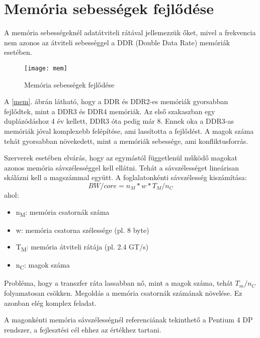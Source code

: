 \section{Memória sebességek fejlődése}
A memória sebességeknél adatátviteli rátával jellemezzük őket, mivel a frekvencia nem azonos az átviteli sebességgel a DDR (Double Data Rate) memóriák esetében.

\begin{figure}[H]
    \texttt{[image: mem]}
    \centering
    \caption{Memória sebességek fejlődése}
    \label{fig:mem}
\end{figure}

A \ref{mem}. ábrán látható, hogy a DDR és DDR2-es memóriák gyorsabban fejlődtek, mint a DDR3 és DDR4 memóriák.
Az első szakaszban egy duplázódáshoz 4 év kellett, DDR3 óta pedig már 8.
Ennek oka a DDR3-as memóriák jóval komplexebb felépítése, ami lassította a fejlődést.
A magok száma tehát gyorsabban növekedett, mint a memóriák sebessége, ami konfliktusforrás.

Szerverek esetében elvárás, hogy az egymástól függetlenül működő magokat azonos memória sávszélességgel kell ellátni.
Tehát a sávszélességet lineárisan skálázni kell a magszámmal együtt.
A foglalatonkénti sávszélesség kiszámítása:
\begin{equation}
    BW/core = n_M*w*T_M/n_C
\end{equation}
ahol:
\begin{itemize}
    \item n\textsubscript{M}: memória csatornák száma
    \item w: memória csatorna szélessége (pl. 8 byte)
    \item T\textsubscript{M}: memória átviteli rátája (pl. 2.4 GT/s)
    \item n\textsubscript{C}: magok száma
\end{itemize}

Probléma, hogy a transzfer ráta lassabban nő, mint a magok száma, tehát $T_m/n_C$ folyamatosan csökken.
Megoldás a memória csatornák számának növelése.
Ez azonban elég komplex feladat.

A magonkénti memória sávszélességnél referenciának tekinthető a Pentium 4 DP rendszer, a fejlesztési cél ehhez az értékhez tartani.
